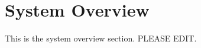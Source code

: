 \section{System Overview}
\label{sec:systemoverview}

This is the system overview section. PLEASE EDIT.